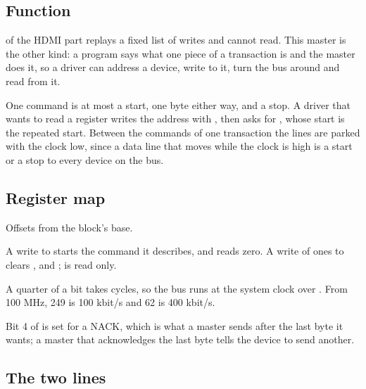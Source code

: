 
%
{}

\subsection*{Function}

 of the HDMI part replays a fixed list of writes and
cannot read. This master is the other kind: a program says what one
piece of a transaction is and the master does it, so a driver can
address a device, write to it, turn the bus around and read from it.

One command is at most a start, one byte either way, and a stop. A
driver that wants to read a register writes the address with
, then asks for , whose start
is the repeated start. Between the commands of one transaction the
lines are parked with the clock low, since a data line that moves
while the clock is high is a start or a stop to every device on the
bus.

\subsection*{Register map}

Offsets from the block's base.


A write to  starts the command it describes, and 
reads zero. A write of ones to  clears ,
 and ;  is read only.

A quarter of a bit takes  cycles, so the bus runs at the
system clock over . From 100 MHz, 249 is
100 kbit/s and 62 is 400 kbit/s.

Bit 4 of  is set for a NACK, which is what a master sends
after the last byte it wants; a master that acknowledges the last byte
tells the device to send another.


\subsection*{The two lines}

